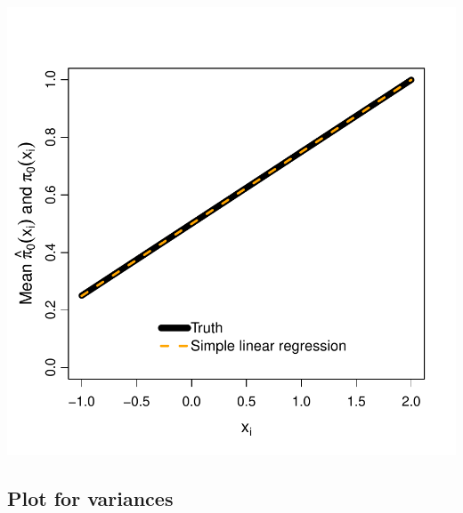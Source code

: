 \documentclass{article}\usepackage[]{graphicx}\usepackage[]{color}
\makeatletter
\def\maxwidth{ %
  \ifdim\Gin@nat@width>\linewidth
    \linewidth
  \else
    \Gin@nat@width
  \fi
}
\newenvironment{knitrout}{}{} %
\makeatother
\begin{document}
\begin{knitrout}
{\centering \includegraphics[width=\maxwidth]{figures/Fig1a-1} 

}



\end{knitrout}

\subsection{Plot for variances}
\end{document}
